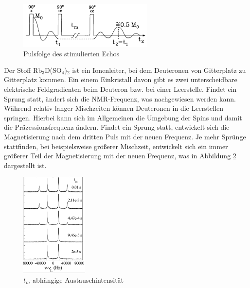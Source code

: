 \begin{figure}[H]
 \includegraphics[width=0.6\textwidth]{../pics/stimEchoFolge.jpg}
 \caption{Pulsfolge des stimulierten Echos}
 \label{pic_stimEchoFolge}
\end{figure}
\noindent
Der Stoff Rb$_3$D(SO$_4$)$_2$ ist ein Ionenleiter, bei dem Deuteronen von Gitterplatz zu Gitterplatz kommen. Ein einem Einkristall davon gibt es zwei
unterscheidbare elektrische Feldgradienten beim Deuteron bzw. bei einer Leerstelle. Findet ein Sprung statt, ändert sich die NMR-Frequenz, was nachgewiesen
werden kann. Während relativ langer Mischzeiten können Deuteronen in die Leerstellen springen. Hierbei kann sich im Allgemeinen 
die Umgebung der Spins und damit die Präzessionsfrequenz ändern. Findet ein Sprung statt, entwickelt sich die Magnetisierung nach dem dritten Puls mit der
neuen Frequenz. Je mehr Sprünge stattfinden, bei beispielsweise größerer Mischzeit, entwickelt sich ein immer größerer Teil der Magnetisierung mit der 
neuen Frequenz, was in Abbildung \ref{pic_neueFrequenz} dargestellt ist.
\begin{figure}[H]
 \includegraphics[width=0.3\textwidth]{../pics/neueFrequenz.jpg}
 \caption{$t_m$-abhängige Austauschintensität}
 \label{pic_neueFrequenz}
\end{figure}
